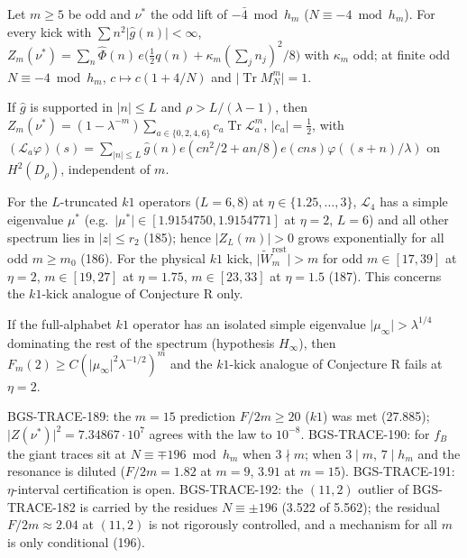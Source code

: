 \begin{theorem}
Let \(m\ge5\) be odd and \(\nu^*\) the odd lift of \(-\bar{4}\bmod h_m\) (\(N\equiv-4\bmod h_m\)). For every kick with \(\sum n^2\lvert\hat g(n)\rvert<\infty\),
\(Z_m(\nu^*)=\sum_n\hat\Phi(n)\,e\bigl(\tfrac12q(n)+\kappa_m(\textstyle\sum_jn_j)^2/8\bigr)\) with \(\kappa_m\) odd; at finite odd \(N\equiv-4\bmod h_m\), \(c\mapsto c(1+4/N)\) and \(\lvert\operatorname{Tr}M_N^m\rvert=1\).
\end{theorem}

\begin{theorem}
If \(\hat g\) is supported in \(\lvert n\rvert\le L\) and \(\rho>L/(\lambda-1)\), then \(Z_m(\nu^*)=(1-\lambda^{-m})\sum_{a\in\{0,2,4,6\}}c_a\operatorname{Tr}\mathcal L_a^m\),
\(\lvert c_a\rvert=\tfrac12\), with \((\mathcal L_a\varphi)(s)=\sum_{\lvert n\rvert\le L}\hat g(n)e(cn^2/2+an/8)e(cns)\varphi((s+n)/\lambda)\) on \(H^2(D_\rho)\), independent of \(m\).
\end{theorem}

\begin{theorem}
For the \(L\)-truncated \(k1\) operators (\(L=6,8\)) at \(\eta\in\{1.25,\dots,3\}\), \(\mathcal L_4\) has a simple eigenvalue \(\mu^*\) (e.g.\ \(\lvert\mu^*\rvert\in[1.9154750,1.9154771]\) at \(\eta=2\), \(L=6\)) and all other spectrum lies in \(\lvert z\rvert\le r_2\) (185); hence \(\lvert Z_L(m)\rvert>0\) grows exponentially for all odd \(m\ge m_0\) (186).
For the physical \(k1\) kick, \(\lvert\tilde W^{\mathrm{rest}}_m\rvert>m\) for odd \(m\in[17,39]\) at \(\eta=2\), \(m\in[19,27]\) at \(\eta=1.75\), \(m\in[23,33]\) at \(\eta=1.5\) (187). This concerns the \(k1\)-kick analogue of Conjecture R only.
\end{theorem}

\begin{theorem}
If the full-alphabet \(k1\) operator has an isolated simple eigenvalue \(\lvert\mu_\infty\rvert>\lambda^{1/4}\) dominating the rest of the spectrum (hypothesis \(H_\infty\)), then \(F_m(2)\ge C(\lvert\mu_\infty\rvert^2\lambda^{-1/2})^m\) and the \(k1\)-kick analogue of Conjecture R fails at \(\eta=2\).
\end{theorem}

\begin{remark}
BGS-TRACE-189: the \(m=15\) prediction \(F/2m\ge20\) (\(k1\)) was met (27.885); \(\lvert Z(\nu^*)\rvert^2=7.34867\cdot10^7\) agrees with the law to \(10^{-8}\).
BGS-TRACE-190: for \(f_B\) the giant traces sit at \(N\equiv\mp196\bmod h_m\) when \(3\nmid m\); when \(3\mid m\), \(7\mid h_m\) and the resonance is diluted (\(F/2m=1.82\) at \(m=9\), \(3.91\) at \(m=15\)).
BGS-TRACE-191: \(\eta\)-interval certification is open.
BGS-TRACE-192: the \((11,2)\) outlier of BGS-TRACE-182 is carried by the residues \(N\equiv\pm196\) (3.522 of 5.562); the residual \(F/2m\approx2.04\) at \((11,2)\) is not rigorously controlled, and a mechanism for all \(m\) is only conditional (196).
\end{remark}

